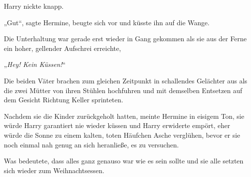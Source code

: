 Harry nickte knapp.

„Gut“, sagte Hermine, beugte sich vor und küsste ihn auf die Wange.

\later

Die Unterhaltung war gerade erst wieder in Gang gekommen als sie aus der Ferne ein hoher, gellender Aufschrei erreichte,

„\emph{Hey! Kein Küssen!}“

Die beiden Väter brachen zum gleichen Zeitpunkt in schallendes Gelächter aus als die zwei Mütter von ihren Stühlen hochfuhren und mit demselben Entsetzen auf dem Gesicht Richtung Keller sprinteten.

Nachdem sie die Kinder zurückgeholt hatten, meinte Hermine in eisigem Ton, sie würde Harry garantiert nie wieder küssen und Harry erwiderte empört, eher würde die Sonne zu einem kalten, toten Häufchen Asche verglühen, bevor er sie noch einmal nah genug an sich heranließe, es zu versuchen.

Was bedeutete, dass alles ganz genauso war wie es sein sollte und sie alle setzten sich wieder zum Weihnachtsessen.

